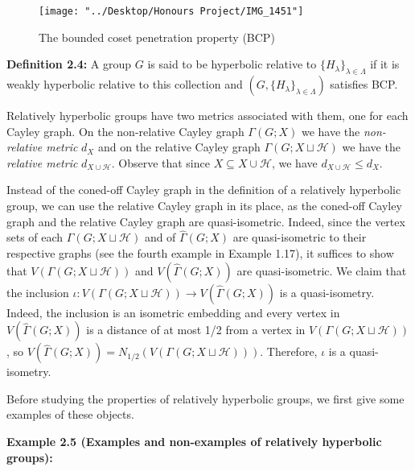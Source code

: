 \documentclass[12pt]{article}
\newcommand{\vs}{\vskip10pt}
\begin{document}
\begin{figure} [H]
	\centering
	\texttt{[image: "../Desktop/Honours Project/IMG\_1451"]}
	\caption{The bounded coset penetration property (BCP)}
	\label{fig:img1451}
\end{figure}
	
	\vs 
	
	\textbf{Definition 2.4: } A group $G$ is said to be hyperbolic relative to $\{H_{\lambda}\}_{\lambda \in \Lambda}$ if it is weakly hyperbolic relative to this collection and $(G, \{H_{\lambda}\}_{\lambda \in \Lambda})$ satisfies BCP. 
	
	\vs 
	
	Relatively hyperbolic groups have two metrics associated with them, one for each Cayley graph. On the non-relative Cayley graph $\Gamma(G;X)$ we have the \textit{non-relative metric} $d_X$ and on the relative Cayley graph $\Gamma(G; X \sqcup \mathcal{H})$ we have the \textit{relative metric} $d_{X \cup \mathcal{H}}$. Observe that since $X \subseteq X \cup \mathcal{H}$, we have $d_{X \cup \mathcal{H}} \leq d_X$.
	
	\vs 
	
	Instead of the coned-off Cayley graph in the definition of a relatively hyperbolic group, we can use the relative Cayley graph in its place, as the coned-off Cayley graph and the relative Cayley graph are quasi-isometric. Indeed, since the vertex sets of each $\Gamma(G; X \sqcup \mathcal{H})$ and of $\hat{\Gamma}(G;X)$ are quasi-isometric to their respective graphs (see the fourth example in Example 1.17), it suffices to show that $V(\Gamma(G; X \sqcup \mathcal{H}))$ and $V(\hat{\Gamma}(G;X))$ are quasi-isometric. We claim that the inclusion $\iota: V(\Gamma(G; X \sqcup \mathcal{H})) \rightarrow V(\hat{\Gamma}(G;X))$ is a quasi-isometry. Indeed, the inclusion is an isometric embedding and every vertex in $V(\hat{\Gamma}(G;X))$ is a distance of at most 1/2 from a vertex in $V(\Gamma(G; X \sqcup \mathcal{H}))$, so $V(\hat{\Gamma}(G;X)) = N_{1/2} (V(\Gamma(G; X \sqcup \mathcal{H})))$. Therefore, $\iota$ is a quasi-isometry. 
	
	\vs
	
	Before studying the properties of relatively hyperbolic groups, we first give some examples of these objects. 
	
	\vs 
	
	\textbf{Example 2.5 (Examples and non-examples of relatively hyperbolic groups): } 
	
\end{document}
